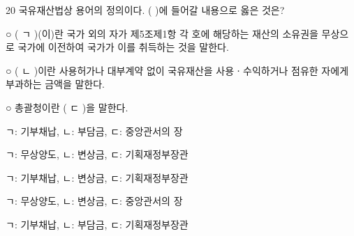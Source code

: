 \begin{question}{20}
국유재산법상 용어의 정의이다. ( )에 들어갈 내용으로 옳은 것은?
\begin{framedtext}
○ ( ㄱ )(이)란 국가 외의 자가 제5조제1항 각 호에 해당하는 재산의 소유권을 무상으로 국가에 이전하여 국가가 이를 취득하는 것을 말한다. \par
○ ( ㄴ )이란 사용허가나 대부계약 없이 국유재산을 사용ㆍ수익하거나 점유한 자에게 부과하는 금액을 말한다. \par
○ 총괄청이란 ( ㄷ )을 말한다.
\end{framedtext}
\begin{choices}
  \item ㄱ: 기부채납, ㄴ: 부담금, ㄷ: 중앙관서의 장
  \item ㄱ: 무상양도, ㄴ: 변상금, ㄷ: 기획재정부장관
  \item ㄱ: 기부채납, ㄴ: 변상금, ㄷ: 기획재정부장관
  \item ㄱ: 무상양도, ㄴ: 변상금, ㄷ: 중앙관서의 장
  \item ㄱ: 기부채납, ㄴ: 부담금, ㄷ: 기획재정부장관
\end{choices}
\end{question}

